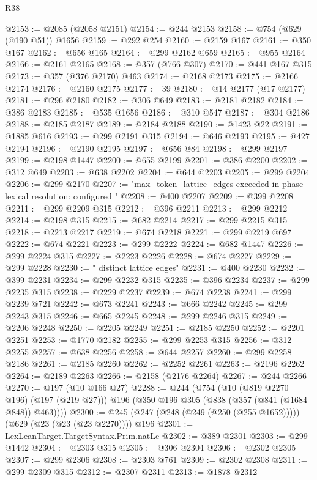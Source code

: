 \begin{lexlean}{R38}
\begin{coremodule}
@2153 := @2085 (@2058 @2151)
@2154 := @244 @2153
@2158 := @754 (@629 (@190 @51)) @1656
@2159 := @292 @254
@2160 := @2159 @167
@2161 := @350 @167
@2162 := @656 @165
@2164 := @299 @2162 @659
@2165 := @955 @2164
@2166 := @2161 @2165
@2168 := @357 (@766 @307)
@2170 := @441 @167 @315
@2173 := @357 (@376 @2170) @463
@2174 := @2168 @2173
@2175 := @2166 @2174
@2176 := @2160 @2175
@2177 := 39
@2180 := @14 @2177 (@17 @2177)
@2181 := @296 @2180
@2182 := @306 @649
@2183 := @2181 @2182
@2184 := @386 @2183
@2185 := @535 @1656
@2186 := @310 @547
@2187 := @304 @2186
@2188 := @2185 @2187
@2189 := @2184 @2188
@2190 := @1423 @22
@2191 := @1885 @616
@2193 := @299 @2191 @315
@2194 := @646 @2193
@2195 := @427 @2194
@2196 := @2190 @2195
@2197 := @656 @84
@2198 := @299 @2197
@2199 := @2198 @1447
@2200 := @655 @2199
@2201 := @386 @2200
@2202 := @312 @649
@2203 := @638 @2202
@2204 := @644 @2203
@2205 := @299 @2204
@2206 := @299 @2170
@2207 := "max_token_lattice_edges exceeded in phase lexical resolution: configured "
@2208 := @400 @2207
@2209 := @399 @2208
@2211 := @299 @2209 @315
@2212 := @396 @2211
@2213 := @299 @2212
@2214 := @2198 @315
@2215 := @682 @2214
@2217 := @299 @2215 @315
@2218 := @2213 @2217
@2219 := @674 @2218
@2221 := @299 @2219 @697
@2222 := @674 @2221
@2223 := @299 @2222
@2224 := @682 @1447
@2226 := @299 @2224 @315
@2227 := @2223 @2226
@2228 := @674 @2227
@2229 := @299 @2228
@2230 := " distinct lattice edges"
@2231 := @400 @2230
@2232 := @399 @2231
@2234 := @299 @2232 @315
@2235 := @396 @2234
@2237 := @299 @2235 @315
@2238 := @2229 @2237
@2239 := @674 @2238
@2241 := @299 @2239 @721
@2242 := @673 @2241
@2243 := @666 @2242
@2245 := @299 @2243 @315
@2246 := @665 @2245
@2248 := @299 @2246 @315
@2249 := @2206 @2248
@2250 := @2205 @2249
@2251 := @2185 @2250
@2252 := @2201 @2251
@2253 := @1770 @2182
@2255 := @299 @2253 @315
@2256 := @312 @2255
@2257 := @638 @2256
@2258 := @644 @2257
@2260 := @299 @2258 @2186
@2261 := @2185 @2260
@2262 := @2252 @2261
@2263 := @2196 @2262
@2264 := @2189 @2263
@2266 := @2158 (@2176 @2264)
@2267 := @244 @2266
@2270 := @197 (@10 @166 @27)
@2288 := @244
    (@754
      (@10 (@819 @2270 @196) (@197 (@219 @27)))
      @196
      (@350 @196 @305 (@838 (@357 (@841 (@1684 @848)) @463))))
@2300 := @245 (@247 (@248 (@249 (@250 (@255 @1652))))) (@629 (@23 (@23 (@23 @2270)))) @196
@2301 := LexLeanTarget.TargetSyntax.Prim.natLe
@2302 := @389 @2301
@2303 := @299 @1442
@2304 := @2303 @315
@2305 := @306 @2304
@2306 := @2302 @2305
@2307 := @299 @2306
@2308 := @2303 @761
@2309 := @2302 @2308
@2311 := @299 @2309 @315
@2312 := @2307 @2311
@2313 := @1878 @2312

\end{coremodule}
\end{lexlean}
